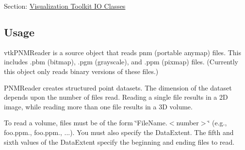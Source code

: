 Section\-: \hyperlink{sec_vtkio}{Visualization Toolkit I\-O Classes} \hypertarget{vtkwidgets_vtkxyplotwidget_Usage}{}\subsection{Usage}\label{vtkwidgets_vtkxyplotwidget_Usage}
vtk\-P\-N\-M\-Reader is a source object that reads pnm (portable anymap) files. This includes .pbm (bitmap), .pgm (grayscale), and .ppm (pixmap) files. (Currently this object only reads binary versions of these files.)

P\-N\-M\-Reader creates structured point datasets. The dimension of the dataset depends upon the number of files read. Reading a single file results in a 2\-D image, while reading more than one file results in a 3\-D volume.

To read a volume, files must be of the form \char`\"{}\-File\-Name.$<$number$>$\char`\"{} (e.\-g., foo.\-ppm., foo.\-ppm., ...). You must also specify the Data\-Extent. The fifth and sixth values of the Data\-Extent specify the beginning and ending files to read.

